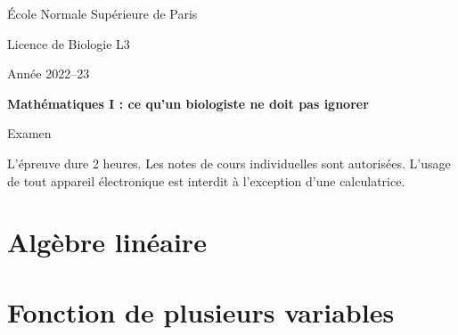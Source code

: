 \documentclass[french, 12pt]{article}
\title{}
\begin{document}

\begin{centering}
  \footnotesize{\sc École Normale Supérieure de Paris} 
  
  \bigskip
  \footnotesize{\sc Licence de Biologie L3}
  
  \bigskip
  \footnotesize{\sc Année 2022–23}
  
  \bigskip
  {\bf Mathématiques I : ce qu’un biologiste ne doit pas ignorer} 
  
  \bigskip
  {\sc Examen}
  
\end{centering}

\bigskip
L'épreuve dure 2 heures. 
Les notes de cours individuelles sont autorisées.
L’usage de tout appareil électronique est interdit à l’exception d’une calculatrice.

\section{Algèbre linéaire}



\section{Fonction de plusieurs variables}



\end{document}

